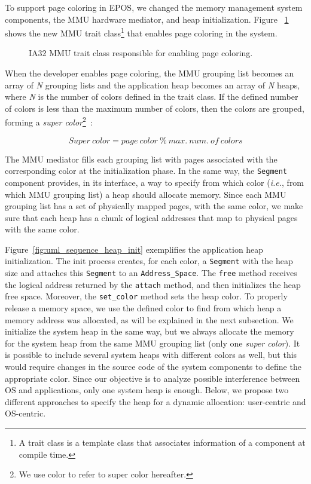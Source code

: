 \documentclass[10pt, conference, compsocconf]{IEEEtran}
\newcommand{\prg}[3][ht!]{
  \begin{figure}[#1]
      
    \caption{#3\label{prg:#2}}
  \end{figure}
}
\begin{document}
To support page coloring in EPOS, we changed the memory management system components, the MMU hardware mediator, and heap initialization. Figure ~\ref{prg:mmu_traits} shows the new MMU trait class\footnote{A trait class is a template class that associates information of a component at compile time.} that enables page coloring in the system.

\prg{mmu_traits}{IA32 MMU trait class responsible for enabling page coloring.}

When the developer enables page coloring, the MMU grouping list becomes an array of \textit{N} grouping lists and the application heap becomes an array of \textit{N}  heaps, where \textit{N} is the number of colors defined in the trait class. If the defined number of colors is less than the maximum number of colors, then the colors are grouped, forming a \textit{super color}\footnote{We use color to refer to super color hereafter.}~\cite{Lin:2008}: 

\begin{equation}
Super\ color = page\ color\ \%\ max.\ num.\ of\ colors
\end{equation}

The MMU mediator fills each grouping list with pages associated with the corresponding color at the initialization phase. In the same way, the \texttt{Segment} component provides, in its interface, a way to specify from which color (\textit{i.e.}, from which MMU grouping list) a heap should allocate memory. Since each MMU grouping list has a set of physically mapped pages, with the same color, we make sure that each heap has a chunk of logical addresses that map to physical pages with the same color.

Figure~\ref{fig:uml_sequence_heap_init} exemplifies the application heap initialization. The init process creates, for each color, a \texttt{Segment} with the heap size and attaches this \texttt{Segment} to an \texttt{Address\_Space}. The \texttt{free} method receives the logical address returned by the \texttt{attach} method, and then initializes the heap free space.  Moreover, the \texttt{set\_color} method sets the heap color. To properly release a memory space, we use the defined color to find from which heap a memory address was allocated, as will be explained in the next subsection. We initialize the system heap in the same way, but we always allocate the memory for the system heap from the same MMU grouping list (only one \textit{super color}). It is possible to include several system heaps with different colors as well, but this would require changes in the source code of the system components to define the appropriate color. Since our objective is to analyze possible interference between OS and applications, only one system heap is enough. Below, we propose two different approaches to specify the heap for a dynamic allocation: user-centric and OS-centric.
\end{document}
